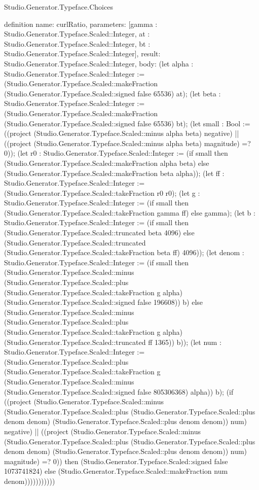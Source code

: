 \begin{lexlean}{Studio.Generator.Typeface.Choices}
\begin{semanticmodule}
definition{
  name: curlRatio,
  parameters: [gamma : Studio.Generator.Typeface.Scaled::Integer, at : Studio.Generator.Typeface.Scaled::Integer, bt : Studio.Generator.Typeface.Scaled::Integer],
  result: Studio.Generator.Typeface.Scaled::Integer,
  body: (let alpha : Studio.Generator.Typeface.Scaled::Integer := (Studio.Generator.Typeface.Scaled::makeFraction (Studio.Generator.Typeface.Scaled::signed false 65536) at); (let beta : Studio.Generator.Typeface.Scaled::Integer := (Studio.Generator.Typeface.Scaled::makeFraction (Studio.Generator.Typeface.Scaled::signed false 65536) bt); (let small : Bool := ((project (Studio.Generator.Typeface.Scaled::minus alpha beta) negative) || ((project (Studio.Generator.Typeface.Scaled::minus alpha beta) magnitude) =? 0)); (let r0 : Studio.Generator.Typeface.Scaled::Integer := (if small then (Studio.Generator.Typeface.Scaled::makeFraction alpha beta) else (Studio.Generator.Typeface.Scaled::makeFraction beta alpha)); (let ff : Studio.Generator.Typeface.Scaled::Integer := (Studio.Generator.Typeface.Scaled::takeFraction r0 r0); (let g : Studio.Generator.Typeface.Scaled::Integer := (if small then (Studio.Generator.Typeface.Scaled::takeFraction gamma ff) else gamma); (let b : Studio.Generator.Typeface.Scaled::Integer := (if small then (Studio.Generator.Typeface.Scaled::truncated beta 4096) else (Studio.Generator.Typeface.Scaled::truncated (Studio.Generator.Typeface.Scaled::takeFraction beta ff) 4096)); (let denom : Studio.Generator.Typeface.Scaled::Integer := (if small then (Studio.Generator.Typeface.Scaled::minus (Studio.Generator.Typeface.Scaled::plus (Studio.Generator.Typeface.Scaled::takeFraction g alpha) (Studio.Generator.Typeface.Scaled::signed false 196608)) b) else (Studio.Generator.Typeface.Scaled::minus (Studio.Generator.Typeface.Scaled::plus (Studio.Generator.Typeface.Scaled::takeFraction g alpha) (Studio.Generator.Typeface.Scaled::truncated ff 1365)) b)); (let num : Studio.Generator.Typeface.Scaled::Integer := (Studio.Generator.Typeface.Scaled::plus (Studio.Generator.Typeface.Scaled::takeFraction g (Studio.Generator.Typeface.Scaled::minus (Studio.Generator.Typeface.Scaled::signed false 805306368) alpha)) b); (if ((project (Studio.Generator.Typeface.Scaled::minus (Studio.Generator.Typeface.Scaled::plus (Studio.Generator.Typeface.Scaled::plus denom denom) (Studio.Generator.Typeface.Scaled::plus denom denom)) num) negative) || ((project (Studio.Generator.Typeface.Scaled::minus (Studio.Generator.Typeface.Scaled::plus (Studio.Generator.Typeface.Scaled::plus denom denom) (Studio.Generator.Typeface.Scaled::plus denom denom)) num) magnitude) =? 0)) then (Studio.Generator.Typeface.Scaled::signed false 1073741824) else (Studio.Generator.Typeface.Scaled::makeFraction num denom)))))))))))
}


\end{semanticmodule}
\end{lexlean}
